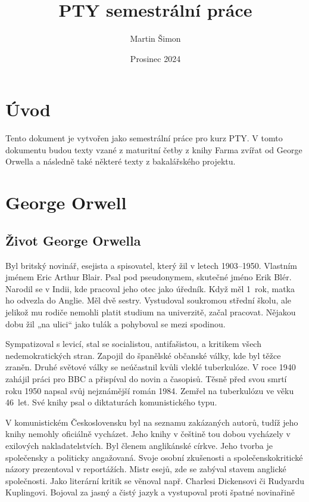 \documentclass{article}
\title{PTY semestrální práce}
\author{Martin Šimon}
\date{Prosinec 2024}
\begin{document}
\maketitle


\tableofcontents
{} %
\setcounter{page}{2}

\clearpage

\section{Úvod}
Tento dokument je vytvořen jako semestrální práce pro kurz PTY. V tomto dokumentu budou texty vzané z 
maturitní četby z knihy Farma zvířat od George Orwella a následně také některé texty z bakalářského projektu.

\section{George Orwell}

\subsection{Život George Orwella}

Byl britský novinář, esejista a spisovatel, který žil v letech 1903–1950. Vlastním jménem Eric Arthur Blair. Psal pod pseudonymem, skutečné jméno Erik Blér. Narodil se v Indii, kde pracoval jeho otec jako úředník. Když měl 1~rok, matka ho odvezla do Anglie. Měl dvě sestry. Vystudoval soukromou střední školu, ale jelikož mu rodiče nemohli platit studium na univerzitě, začal pracovat. Nějakou dobu žil „na ulici“ jako tulák a pohyboval se mezi spodinou. 

Sympatizoval s levicí, stal se socialistou, antifašistou, a kritikem všech nedemokratických stran. 
Zapojil do španělské občanské války, kde byl těžce zraněn. Druhé světové války se neúčastnil kvůli vleklé 
tuberkulóze. V roce 1940 zahájil práci pro BBC a přispíval do novin a časopisů. Těsně před svou smrtí roku 1950 
napsal svůj nejznámější román 1984. Zemřel na tuberkulózu ve věku 46~let. Své knihy psal o diktaturách 
komunistického typu. 

V komunistickém Československu byl na seznamu zakázaných autorů, tudíž jeho knihy nemohly oficiálně vycházet. 
Jeho knihy v češtině tou dobou vycházely v exilových nakladatelstvích. Byl členem anglikánské církve. Jeho 
tvorba je společensky a politicky angažovaná. Svoje osobní zkušenosti a společenskokritické názory prezentoval 
v reportážích. Mistr esejů, zde se zabýval stavem anglické společnosti. Jako literární kritik se věnoval 
např. Charlesi Dickensovi či Rudyardu Kuplingovi. Bojoval za jasný a čistý jazyk a vystupoval proti špatné 
novinařině
\end{document}
